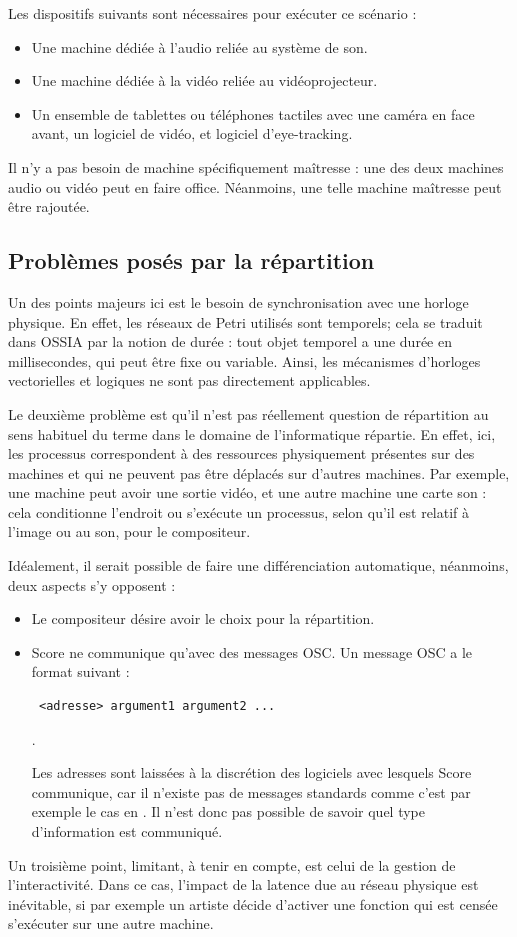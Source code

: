 Les dispositifs suivants sont nécessaires pour exécuter ce scénario : 
\begin{itemize}
	\item Une machine dédiée à l'audio reliée au système de son.
	\item Une machine dédiée à la vidéo reliée au vidéoprojecteur.
	\item Un ensemble de tablettes ou téléphones tactiles avec une caméra en face avant, un logiciel de vidéo, et logiciel d'eye-tracking.
\end{itemize}

Il n'y a pas besoin de machine spécifiquement maîtresse : une des deux machines audio ou vidéo peut en faire office.
Néanmoins, une telle machine maîtresse peut être rajoutée.
\subsection{Problèmes posés par la répartition}
\label{section.pbRepart}
Un des points majeurs ici est le besoin de synchronisation avec une horloge physique. En effet, les réseaux de Petri utilisés sont temporels; cela se traduit dans \ac{OSSIA} par la notion de durée : tout objet temporel a une durée en millisecondes, qui peut être fixe ou variable. Ainsi, les mécanismes d'horloges vectorielles et logiques ne sont pas directement applicables.

Le deuxième problème est qu'il n'est pas réellement question de répartition au sens habituel du terme dans le domaine de l'informatique répartie. En effet, ici, les processus correspondent à des ressources physiquement présentes sur des machines et qui ne peuvent pas être déplacés sur d'autres machines. Par exemple, une machine peut avoir une sortie vidéo, et une autre machine une carte son : cela conditionne l'endroit ou s'exécute un processus, selon qu'il est relatif à l'image ou au son, pour le compositeur.

Idéalement, il serait possible de faire une différenciation automatique, néanmoins, deux aspects s'y opposent : 
\begin{itemize}
	\item Le compositeur désire avoir le choix pour la répartition.
	\item Score ne communique qu'avec des messages \ac{OSC}. Un message \ac{OSC} a le format suivant : 
	\begin{verbatim} <adresse> argument1 argument2 ... \end{verbatim}.
	
	Les adresses sont laissées à la discrétion des logiciels avec lesquels Score communique, car il n'existe pas de messages standards comme c'est par exemple le cas en . Il n'est donc pas possible de savoir quel type d'information est communiqué. 
\end{itemize}
Un troisième point, limitant, à tenir en compte, est celui de la gestion de l'interactivité. Dans ce cas, l'impact de la latence due au réseau physique est inévitable, si par exemple un artiste décide d'activer une fonction qui est censée s'exécuter sur une autre machine.


